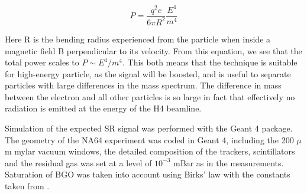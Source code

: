 \begin{equation}
  \label{eq:srd-power}
  P = \frac{q^2 c}{6 \pi R^2}\frac{E^4}{m^4}
\end{equation}

Here R is the bending radius experienced from the particle when inside a magnetic field B perpendicular to its velocity. From this equation, we see that the total power scales to $P\sim E^4/m^4$. This both means that the technique is suitable for high-energy particle, as the signal will be boosted, and is useful to separate particles with large differences in the mass spectrum. The difference in mass between the electron and all other particles is so large in fact that effectively no radiation is emitted at the energy of the H4 beamline. 

Simulation of the expected SR signal was performed with the Geant 4 package\cite{ALLISON2016186,1610988,AGOSTINELLI2003250}.
The geometry of the NA64 experiment was coded in Geant 4, including the 200 $\mu$m mylar vacuum windows, the detailed composition of the trackers, scintillators and the residual gas was set at a level of $10^{-3}$ mBar as in the measurements. Saturation of BGO was taken into account using Birks' law with the constants taken from \cite{AVDEICHIKOV2002251}.

